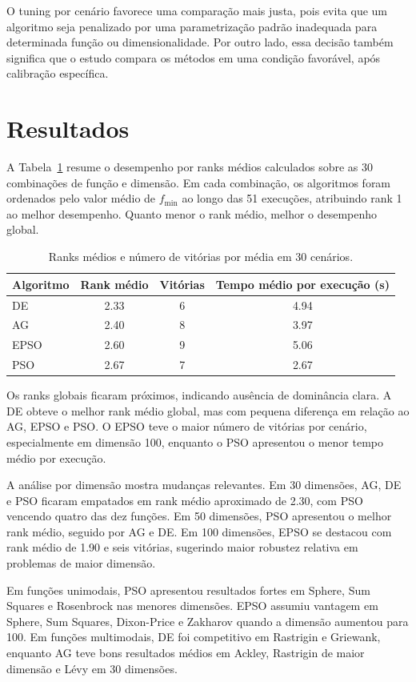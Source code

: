 \documentclass[runningheads]{llncs}
\begin{document}
O tuning por cenário favorece uma comparação mais justa, pois evita que um algoritmo seja penalizado por uma parametrização padrão inadequada para determinada função ou dimensionalidade. Por outro lado, essa decisão também significa que o estudo compara os métodos em uma condição favorável, após calibração específica.

\section{Resultados}

A Tabela~\ref{tab:rankings} resume o desempenho por ranks médios calculados sobre as 30 combinações de função e dimensão. Em cada combinação, os algoritmos foram ordenados pelo valor médio de $f_{\min}$ ao longo das 51 execuções, atribuindo rank 1 ao melhor desempenho. Quanto menor o rank médio, melhor o desempenho global.

\begin{table}
\centering
\caption{Ranks médios e número de vitórias por média em 30 cenários.}
\label{tab:rankings}
\begin{tabular}{lccc}
\toprule
Algoritmo & Rank médio & Vitórias & Tempo médio por execução (s) \\
\midrule
DE & 2.33 & 6 & 4.94 \\
AG & 2.40 & 8 & 3.97 \\
EPSO & 2.60 & 9 & 5.06 \\
PSO & 2.67 & 7 & 2.67 \\
\bottomrule
\end{tabular}
\end{table}

Os ranks globais ficaram próximos, indicando ausência de dominância clara. A DE obteve o melhor rank médio global, mas com pequena diferença em relação ao AG, EPSO e PSO. O EPSO teve o maior número de vitórias por cenário, especialmente em dimensão 100, enquanto o PSO apresentou o menor tempo médio por execução.

A análise por dimensão mostra mudanças relevantes. Em 30 dimensões, AG, DE e PSO ficaram empatados em rank médio aproximado de 2.30, com PSO vencendo quatro das dez funções. Em 50 dimensões, PSO apresentou o melhor rank médio, seguido por AG e DE. Em 100 dimensões, EPSO se destacou com rank médio de 1.90 e seis vitórias, sugerindo maior robustez relativa em problemas de maior dimensão.

Em funções unimodais, PSO apresentou resultados fortes em Sphere, Sum Squares e Rosenbrock nas menores dimensões. EPSO assumiu vantagem em Sphere, Sum Squares, Dixon-Price e Zakharov quando a dimensão aumentou para 100. Em funções multimodais, DE foi competitivo em Rastrigin e Griewank, enquanto AG teve bons resultados médios em Ackley, Rastrigin de maior dimensão e Lévy em 30 dimensões.
\end{document}
